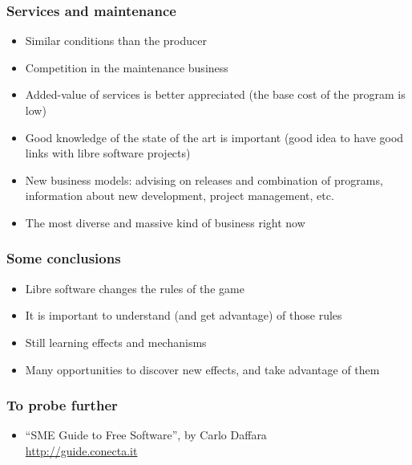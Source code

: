 
\begin{frame}
\frametitle{Services and maintenance}

\begin{itemize}
\item Similar conditions than the producer
\item Competition in the maintenance business
\item Added-value of services is better appreciated (the base cost of the program is low)
\item Good knowledge of the state of the art is important (good idea to have good links with libre software projects)
\item New business models: advising on releases and combination of programs, information about new development, project management, etc.
\item The most diverse and massive kind of business right now
\end{itemize}
\end{frame}


\begin{frame}
\frametitle{Some conclusions}

\begin{itemize}
\item Libre software changes the rules of the game
\item It is important to understand (and get advantage) of those rules
\item Still learning effects and mechanisms
\item Many opportunities to discover new effects, and take advantage of them
\end{itemize}
\end{frame}


\begin{frame}
\frametitle{To probe further}

\begin{itemize}
\item ``SME Guide to Free Software'', by Carlo Daffara \\
  \url{http://guide.conecta.it}
\end{itemize}
\end{frame}
